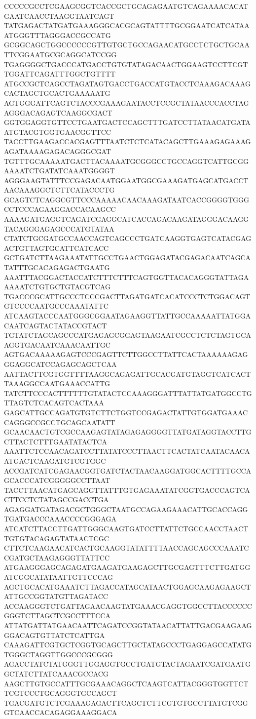 CCCCCGCCTCGAAGCGGTCACCGCTGCAGAGAATGTCAGAAAACACATGAATCAACCTAAGGTAATCAGT
TATGAGACTATGATGAAAGGGCACGCAGTATTTTGCGGAATCATCATAAATGGGTTTAGGGACCGCCATG
GCGGCAGCTGGCCCCCCGTTGTGCTGCCAGAACATGCCTCTGCTGCAATTCGGAATGCGCAGGCATCCGG
TGAGGGGCTGACCCATGACCTGTGTATAGACAACTGGAAGTCCTTCGTTGGATTCAGATTTGGCTGTTTT
ATGCCGCTCAGCCTAGATAGTGACCTGACCATGTACCTCAAAGACAAAGCACTAGCTGCACTGAAAAATG
AGTGGGATTCAGTCTACCCGAAAGAATACCTCCGCTATAACCCACCTAGAGGGACAGAGTCAAGGCGACT
GGTGGAGGTGTTCCTGAATGACTCCAGCTTTGATCCTTATAACATGATAATGTACGTGGTGAACGGTTCC
TACCTTGAAGACCACGAGTTTAATCTCTCATACAGCTTGAAAGAGAAAGAGATAAAAGAGACAGGGCGAT
TGTTTGCAAAAATGACTTACAAAATGCGGGCCTGCCAGGTCATTGCGGAAAATCTGATATCAAATGGGGT
AGGGAAGTATTTCCGAGACAATGGAATGGCGAAAGATGAGCATGACCTAACAAAGGCTCTTCATACCCTG
GCAGTCTCAGGCGTTCCCAAAAACAACAAAGATAATCACCGGGGTGGGCCTCCCAGAAGGACCACAAGCC
AAAAGATGAGGTCAGATCGAGGCATCACCAGACAAGATAGGGACAAGGTACAGGGAGAGCCCATGTATAA
CTATCTGCGATGCCAACCAGTCAGCCCTGATCAAGGTGAGTCATACGAGACTGTTAGTGCATTCATCACC
GCTGATCTTAAGAAATATTGCCTGAACTGGAGATACGAGACAATCAGCATATTTGCACAGAGACTGAATG
AAATTTACGGACTACCATCTTTCTTTCAGTGGTTACACAGGGTATTAGAAAAATCTGTGCTGTACGTCAG
TGACCCGCATTGCCCTCCCGACTTAGATGATCACATCCCTCTGGACAGTGTCCCCAATGCCCAAATATTC
ATCAAGTACCCAATGGGCGGAATAGAAGGTTATTGCCAAAAATTATGGACAATCAGTACTATACCGTACT
TGTATCTAGCAGCCCATGAGAGCGGAGTAAGAATCGCCTCTCTAGTGCAAGGTGACAATCAAACAATTGC
AGTGACAAAAAGAGTCCCGAGTTCTTGGCCTTATTCACTAAAAAAGAGGGAGGCATCCAGAGCAGCTCAA
AATTACTTCGTGGTTTTAAGGCAGAGATTGCACGATGTAGGTCATCACTTAAAGGCCAATGAAACCATTG
TATCTTCCCACTTTTTTGTATACTCCAAAGGGATTTATTATGATGGCCTGTTAGTCTCACAGTCACTAAA
GAGCATTGCCAGATGTGTCTTCTGGTCCGAGACTATTGTGGATGAAACCAGGGCCGCCTGCAGCAATATT
GCAACAACTGTCGCCAAGAGTATAGAGAGGGGTTATGATAGGTACCTTGCTTACTCTTTGAATATACTCA
AAATTCTCCAACAGATCCTTATATCCCTTAACTTCACTATCAATACAACAATGACTCAAGATGTCGTGGC
ACCGATCATCGAGAACGGTGATCTACTAACAAGGATGGCACTTTTGCCAGCACCCATCGGGGGCCTTAAT
TACCTTAACATGAGCAGGTTATTTGTGAGAAATATCGGTGACCCAGTCACTTCCTCTATAGCCGACCTGA
AGAGGATGATAGACGCTGGGCTAATGCCAGAAGAAACATTGCACCAGGTGATGACCCAAACCCCGGGAGA
ATCATCTTACCTTGATTGGGCAAGTGATCCTTATTCTGCCAACCTAACTTGTGTACAGAGTATAACTCGC
CTTCTCAAGAACATCACTGCAAGGTATATTTTAACCAGCAGCCCAAATCCGATGCTAAGAGGGTTATTCC
ATGAAGGGAGCAGAGATGAAGATGAAGAGCTTGCGAGTTTCTTGATGGATCGGCATATAATTGTTCCCAG
AGCTGCACATGAAATCTTAGACCATAGCATAACTGGAGCAAGAGAAGCTATTGCCGGTATGTTAGATACC
ACCAAGGGTCTGATTAGAACAAGTATGAAACGAGGTGGCCTTACCCCCCGGGTCTTAGCTCGCCTTTCCA
ATTATGATTATGAACAATTCAGATCCGGTATAACATTATTGACGAAGAAGGGACAGTGTTATCTCATTGA
CAAAGATTCGTGCTCGGTGCAGCTTGCTATAGCCCTGAGGAGCCATATGTGGGCTAGGTTGGCCCGCGGG
AGACCTATCTATGGGTTGGAGGTGCCTGATGTACTAGAATCGATGAATGGCTATCTTATCAAACGCCACG
AAGCTTGTGCCATTTGCGAAACAGGCTCAAGTCATTACGGGTGGTTCTTCGTCCCTGCAGGGTGCCAGCT
TGACGATGTCTCGAAAGAGACTTCAGCTCTTCGTGTGCCTTATGTCGGGTCAACCACAGAGGAAAGGACA
